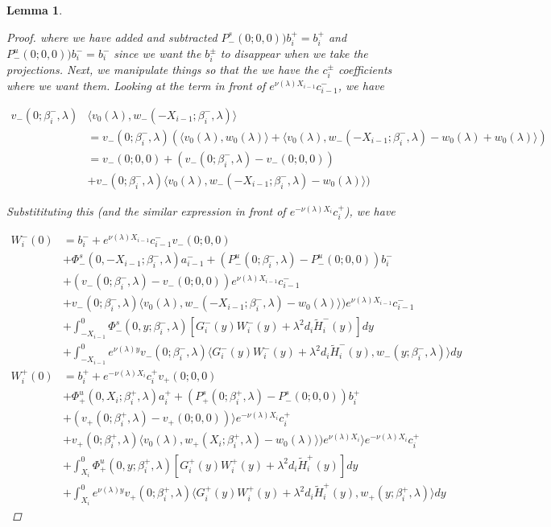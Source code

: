 \documentclass[12pt]{article}
\newtheorem{lemma}{Lemma}
\begin{document}
\begin{lemma}
\begin{proof}
where we have added and subtracted $P^s_-(0; 0, 0))b_i^+ = b_i^+$ and $P^u_-(0; 0, 0))b_i^- = b_i^-$ since we want the $b_i^\pm$ to disappear when we take the projections. Next, we manipulate things so that the we have the $c_i^\pm$ coefficients where we want them. Looking at the term in front of $e^{\nu(\lambda)X_{i-1}} c_{i-1}^-$, we have

\begin{align*}
v_-(0; \beta_i^-, \lambda) & \langle v_0(\lambda), w_-(-X_{i-1}; \beta_i^-, \lambda) \rangle \\
&= v_-(0; \beta_i^-, \lambda) ( \langle v_0(\lambda), w_0(\lambda) \rangle + \langle v_0(\lambda), w_-(-X_{i-1}; \beta_i^-, \lambda) - w_0(\lambda) + w_0(\lambda) \rangle ) \\
&= v_-(0; 0, 0) + (v_-(0; \beta_i^-, \lambda) - v_-(0; 0, 0)) \\
&+ v_-(0; \beta_i^-, \lambda) \langle v_0(\lambda), w_-(-X_{i-1}; \beta_i^-, \lambda) - w_0(\lambda) \rangle )
\end{align*}

Substitituting this (and the similar expression in front of $e^{-\nu(\lambda)X_i} c_i^+$), we have

\begin{align*}
W_i^-(0) &=  b_i^- + e^{\nu(\lambda)X_{i-1}} c_{i-1}^- v_-(0; 0, 0) \\
&+\Phi^s_-(0, -X_{i-1}; \beta_i^-, \lambda)a_{i-1}^- + (P^u_-(0; \beta_i^-, \lambda) - P^u_-(0; 0, 0))b_i^- \\
&+ (v_-(0; \beta_i^-, \lambda) - v_-(0; 0, 0)) e^{\nu(\lambda)X_{i-1}} c_{i-1}^- \\
&+ v_-(0; \beta_i^-, \lambda) \langle v_0(\lambda), w_-(-X_{i-1}; \beta_i^-, \lambda) - w_0(\lambda) \rangle ) e^{\nu(\lambda)X_{i-1}} c_{i-1}^- \\
&+ \int_{-X_{i-1}}^0 \Phi^s_-(0, y; \beta_i^-, \lambda) [ G_i^-(y)W_i^-(y) + \lambda^2 d_i \tilde{H}_i^-(y) ] dy \\
&+ \int_{-X_{i-1}}^0
e^{\nu(\lambda)y} v_-(0; \beta_i^-, \lambda) \langle G_i^-(y)W_i^-(y) + \lambda^2 d_i \tilde{H}_i^-(y), w_-(y; \beta_i^-, \lambda) \rangle dy \\
W_i^+(0) &= b_i^+ + e^{-\nu(\lambda) X_i} c_i^+ v_+(0; 0, 0) \\
&+ \Phi^u_+(0, X_i; \beta_i^+, \lambda)a_i^+ + (P^s_+(0; \beta_i^+, \lambda) - P^s_-(0; 0, 0))b_i^+ \\
&+ (v_+(0; \beta_i^+, \lambda) - v_+(0; 0, 0)) \rangle e^{-\nu(\lambda) X_i} c_i^+ \\
&+ v_+(0; \beta_i^+, \lambda) \langle v_0(\lambda), w_+(X_i; \beta_i^+, \lambda) - w_0(\lambda) \rangle ) e^{\nu(\lambda)X_i} \rangle e^{-\nu(\lambda) X_i} c_i^+ \\
&+ \int_{X_i}^0 \Phi^u_+(0, y; \beta_i^+, \lambda) [ G_i^+(y)W_i^+(y) + \lambda^2 d_i \tilde{H}_i^+(y) ] dy \\
&+ \int_{X_i}^0 e^{\nu(\lambda)y} v_+(0; \beta_i^+, \lambda) \langle G_i^+(y)W_i^+(y) + \lambda^2 d_i \tilde{H}_i^+(y), w_+(y; \beta_i^+, \lambda) \rangle dy
\end{align*}


\end{proof}
\end{lemma}
\end{document}

